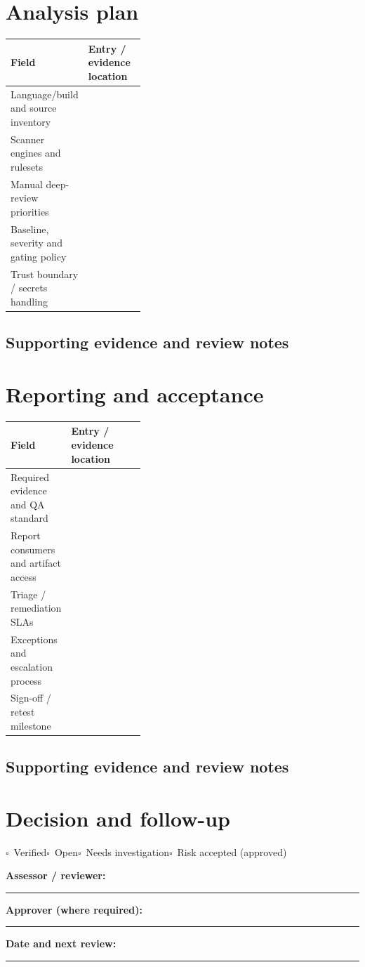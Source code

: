 \documentclass[10pt,letterpaper]{article}
\newcommand{\checkbox}{\(\square\)}
\newcommand{\blankline}{\noindent\rule{\linewidth}{0.35pt}\par\vspace{4pt}}
\newcommand{\writearea}[1]{\par\begin{tcolorbox}[colback=white,colframe=linegray,boxrule=0.5pt,height=#1,sharp corners]\mbox{}\end{tcolorbox}\par}
\begin{document}
\section{Analysis plan}
\begin{tabularx}{\linewidth}{@{}p{0.38\linewidth}Y@{}}
\toprule Field & Entry / evidence location\\\midrule
Language/build and source inventory & \\[1.0em]
\midrule
Scanner engines and rulesets & \\[1.0em]
\midrule
Manual deep-review priorities & \\[1.0em]
\midrule
Baseline, severity and gating policy & \\[1.0em]
\midrule
Trust boundary / secrets handling & \\[1.0em]
\midrule
\end{tabularx}
\subsection{Supporting evidence and review notes}
\writearea{1.45in}
\clearpage
\section{Reporting and acceptance}
\begin{tabularx}{\linewidth}{@{}p{0.38\linewidth}Y@{}}
\toprule Field & Entry / evidence location\\\midrule
Required evidence and QA standard & \\[1.0em]
\midrule
Report consumers and artifact access & \\[1.0em]
\midrule
Triage / remediation SLAs & \\[1.0em]
\midrule
Exceptions and escalation process & \\[1.0em]
\midrule
Sign-off / retest milestone & \\[1.0em]
\midrule
\end{tabularx}
\subsection{Supporting evidence and review notes}
\writearea{1.45in}
\clearpage
\section{Decision and follow-up}
\noindent\checkbox\ Verified\quad\checkbox\ Open\quad\checkbox\ Needs investigation\quad\checkbox\ Risk accepted (approved)\par
\noindent\textbf{Assessor / reviewer:}\par\blankline\textbf{Approver (where required):}\par\blankline\textbf{Date and next review:}\par\blankline
\writearea{1.7in}
\end{document}
